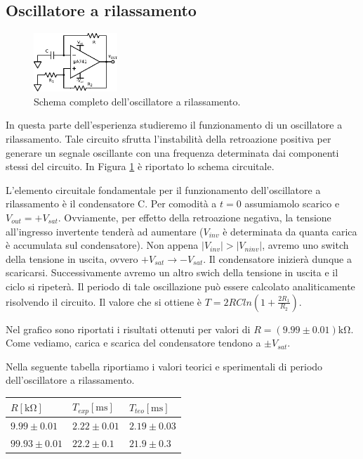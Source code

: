 \subsection{Oscillatore a rilassamento}

\begin{figure}
  \begin{center}
    \includegraphics[width=0.280\textwidth]{../E04/latex/c_rilassamento.pdf}
  \end{center}
  \caption{Schema completo dell'oscillatore a rilassamento.}
  \label{cir4:oscillatore}
\end{figure}

In questa parte dell'esperienza studieremo il funzionamento di un oscillatore a rilassamento. Tale circuito sfrutta l'instabilità della retroazione positiva per generare un segnale oscillante con una frequenza determinata dai componenti stessi del circuito. In Figura \ref{cir4:oscillatore} è riportato lo schema circuitale. 

L'elemento circuitale fondamentale per il funzionamento dell'oscillatore a rilassamento è il condensatore C. Per comodità a $t=0$ assumiamolo scarico e $V_{out}=+V_{sat}$. Ovviamente, per effetto della retroazione negativa, la tensione all'ingresso invertente tenderà ad aumentare ($V_{inv}$ è determinata da quanta carica è accumulata sul condensatore). Non appena $|V_{inv}|>|V_{ninv}|$, avremo uno switch della tensione in uscita, ovvero $+V_{sat} \rightarrow -V_{sat}$. Il condensatore inizierà dunque a scaricarsi. Successivamente avremo un altro swich della tensione in uscita e il ciclo si ripeterà. Il periodo di tale oscillazione può essere calcolato analiticamente risolvendo il circuito. Il valore che si ottiene è $T=2RCln(1+\frac{2R_1}{R_2})$.  

Nel grafico sono riportati i risultati ottenuti per valori di $R=(9.99\pm0.01)\si{\kilo\ohm}$. Come vediamo, carica e scarica del condensatore tendono a $\pm V_{sat}$.

Nella seguente tabella riportiamo i valori teorici e sperimentali di periodo dell'oscillatore a rilassamento.

\begin{center}
\begin{tabular}{|l|l|l|}
\hline
$R [\si{\kilo\ohm}]$	&  $T_{exp} [\si{\milli\second}]$          & $T_{teo} [\si{\milli\second}]$       \\
\hline
$9.99\pm0.01 $ & $2.22\pm0.01$ & $2.19 \pm 0.03$\\
\hline
$99.93\pm0.01 $ & $22.2\pm0.1$ & $21.9 \pm 0.3$\\
\hline
\end{tabular}
\end{center}

